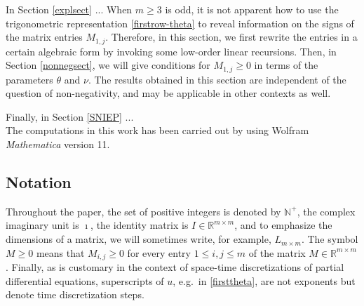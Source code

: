 \documentclass[a4paper]{article}
\newcommand{\te}{\theta}
\newcommand{\nplus}{\mathbb{N}^+}
\newcommand{\rr}{\mathbb{R}}
\begin{document}
In Section \ref{explsect} ... When $m\ge 3$ is odd, it is not apparent how to use the trigonometric representation \eqref{firstrow-theta} to reveal information on the signs of the matrix entries $M_{1,j}$. Therefore, in this section, we first rewrite the  entries in a certain algebraic form by invoking some low-order linear recursions. Then, in Section \ref{nonnegsect}, we will give conditions for $M_{1,j}\ge 0$ in terms of the parameters $\te$ and $\nu$.
The results obtained in this section are independent of the question of non-negativity, and may be applicable in other contexts as well.\\

Finally, in Section \ref{SNIEP} ...\\

The computations in this work has been carried out by using Wolfram \textit{Mathematica} version 11.


\subsection{Notation}
Throughout the paper, the set of positive integers is denoted by $\nplus$, the complex imaginary unit is $\imath$, the identity matrix is $I\in\rr^{m\times m}$, and to emphasize the dimensions of a matrix, we will sometimes write, for example, $L_{m\times m}$.
The symbol $M\ge 0$ means that  $M_{i,j}\ge 0$ for every entry $1\le i, j\le m$ of the matrix $M\in\mathbb{R}^{m\times m}$. Finally, as is customary in the context of space-time discretizations of partial differential equations, superscripts of $u$, e.g.~in \eqref{firsttheta}, are not exponents but denote time discretization steps.  





\end{document}
